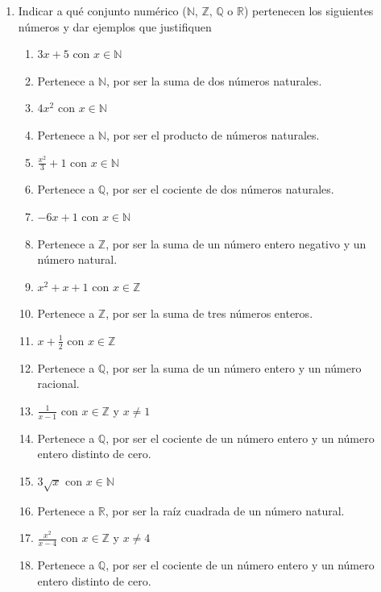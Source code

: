 \documentclass[a4paper]{article}
\newcommand{\answer}{\item[**]}
\newcommand{\exercise}{\item}
\begin{document}
\begin{enumerate}
\begin{enumerate} [label=(\alph*)]
		\item La parábola $kx^2+4x+2$ tiene dos raíces reales.

		\item La parábola $\displaystyle\frac{1}{2}x^2-3x+2k$ no tiene raíces reales.
	\end{enumerate}

	\exercise Indicar a qué conjunto numérico ($\mathbb{N}$, $\mathbb{Z}$, $\mathbb{Q}$ o $\mathbb{R}$) pertenecen los siguientes números y dar ejemplos que justifiquen
	\begin{multicols}{2}
	\begin{enumerate} [label=(\alph*)]
		\item $3x+5$ con $x \in \mathbb{N}$
		\answer Pertenece a $\mathbb{N}$, por ser la suma de dos números naturales.

		\item $4x^2$ con $x \in \mathbb{N}$
		\answer Pertenece a $\mathbb{N}$, por ser el producto de números naturales.

		\item $\displaystyle\frac{x^2}{3}+1$ con $x \in \mathbb{N}$
		\answer Pertenece a $\mathbb{Q}$, por ser el cociente de dos números naturales. 

		\item $-6x+1$ con $x \in \mathbb{N}$
		\answer Pertenece a $\mathbb{Z}$, por ser la suma de un número entero negativo y un número natural.

		\item $x^2+x+1$ con $x \in \mathbb{Z}$
		\answer Pertenece a $\mathbb{Z}$, por ser la suma de tres números enteros.

		\item $x+\displaystyle\frac{1}{2}$ con $x \in \mathbb{Z}$
		\answer Pertenece a $\mathbb{Q}$, por ser la suma de un número entero y un número racional.

		\item $\displaystyle\frac{1}{x-1}$ con $x \in \mathbb{Z}$ y $x \neq 1$
		\answer Pertenece a $\mathbb{Q}$, por ser el cociente de un número entero y un número entero distinto de cero.

		\item $3 \sqrt{x}$ con $x \in \mathbb{N}$
		\answer Pertenece a $\mathbb{R}$, por ser la raíz cuadrada de un número natural.

		\item $\displaystyle\frac{x^2}{x-4}$ con $x \in \mathbb{Z}$ y $x \neq 4$
		\answer Pertenece a $\mathbb{Q}$, por ser el cociente de un número entero y un número entero distinto de cero.


\end{enumerate}
\end{multicols}
\end{enumerate}
\end{document}
